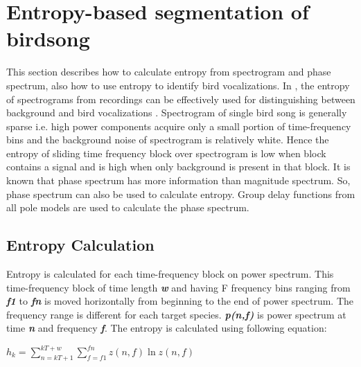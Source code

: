 \documentclass[a4paper]{article}
\begin{document}






\section{Entropy-based segmentation of birdsong}
This section describes how to calculate entropy from spectrogram and phase
spectrum, also how to use entropy to identify bird vocalizations. In
\cite{wang2013}, the entropy of spectrograms from recordings can be effectively used for distinguishing
between background and bird vocalizations \cite{6625329}. Spectrogram of single
bird song is generally sparse i.e. high power components acquire only a small
portion of time-frequency bins and the background noise of spectrogram is
relatively white. Hence  the entropy of sliding time frequency block over
spectrogram is low when block contains a signal and is high when only background
is present in that block. It is known that phase spectrum has more information
than magnitude spectrum. So, phase spectrum can also be used to calculate
entropy. Group delay functions from all pole models are used to calculate the
phase spectrum. 

\subsection{Entropy Calculation}
Entropy is calculated for each time-frequency block on power spectrum. This time-frequency block of time length \textbf{\textit{w}} and having F frequency bins ranging from \textbf{\textit{f1}} to  \textbf{\textit{fn}} is moved horizontally from beginning to the end of power spectrum. The frequency range is different for each target species. \textbf{\textit{p(n,f)}} is power spectrum at time \textbf{\textit{n}} and frequency  \textbf{\textit{f}}. The entropy is calculated using following equation:

\hspace{1cm}

  $h_{k}=\sum_{n=kT+1}^{kT+w}\sum_{f=f1}^{fn}z(n,f) \ln z(n,f)$

 \hspace{1cm}
 
\end{document}
